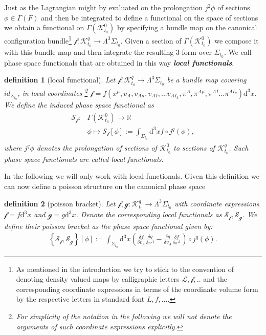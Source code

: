 \documentclass[a4paper,12pt, DIV=14, BCOR=5mm, twoside, headsepline]{scrbook}
\newtheorem{definition}{definition}[section]
\begin{document}
Just as the Lagrangian might by evaluated on the prolongation $j^2\phi$ of sections $\phi \in \Gamma(F)$ and then be integrated to define a functional on the space of sections we obtain a functional on $\Gamma(\mathcal{K}^0_{t_0})$ by specifying a bundle map on the canonical configuration bundle\footnote{As mentioned in the introduction we try to stick to the convention of denoting density valued maps by calligraphic letters $\mathcal{L}, \mathcal{f},..$ and the corresponding coordinate expressions in terms of the coordinate volume form by the respective letters in standard font $L,f,...$.} $\mathcal{f}: \mathcal{K}^q_{t_0} \rightarrow \Lambda^3\Sigma_{t_0}$. Given a section of $\Gamma(\mathcal{K}^0_{t_0})$ we compose it with this bundle map and then integrate the resulting 3-form over $\Sigma_{t_0}$. We call phase space functionals that are obtained in this way \textit{\textbf{local functionals}}. 
\begin{definition}[local functional]
Let $\mathcal{f}: \mathcal{K}^q_{t_0} \rightarrow \Lambda^3\Sigma_{t_0} $ be a bundle map covering $id_{\Sigma_{t_0}}$, in local coordinates \footnote{For simplicity of the notation in the following we will not denote the arguments of such coordinate expressions explicitly.} $\mathcal{f} = f(x^{\mu},v_A,v_{A\mu},v_{AI}, ... v_{AI_k},\pi^A,\pi^{A \mu}, \pi^{AI} ... \pi^{AI_k})\mathrm{d}^3x$. We define the induced phase space functional as
\begin{align}
\begin{aligned}
    \mathcal{S}_{\mathcal{f}} : &\Gamma(\mathcal{K}^0_{t_0}) \longrightarrow \mathbb{R}\\
    &\phi \longmapsto \mathcal{S}_{\mathcal{f}}[\phi] := \int_{\Sigma_{t_0}} \mathrm{d}^3x f \circ j^q(\phi),
\end{aligned}
\end{align}
where $j^q\phi$ denotes the prolongation of sections of $\mathcal{K}^0_{t_0}$ to sections of $\mathcal{K}^q_{t_0}$. Such phase space functionals are called local functionals.
\end{definition}
In the following we will only work with local functionals. 
Given this definition we can now define a poisson structure on the canonical phase space 
\begin{definition}[poisson bracket]
Let $\mathcal{f},\mathcal{g} : \mathcal{K}^q_{t_0} \rightarrow \Lambda^3\Sigma_{t_0} $ with coordinate expressions $\mathcal{f} = f\mathrm{d}^3x$ and $\mathcal{g} = g\mathrm{d}^3x$. Denote the corresponding local functionals as $\mathcal{S}_{\mathcal{f}}, \mathcal{S}_{\mathcal{g}}$. We define their poisson bracket as the phase space functional given by:
\begin{align}
\left \{ \mathcal{S}_{\mathcal{f}}, \mathcal{S}_{\mathcal{g}} \right \}[\phi] := \int _{\Sigma_{t_0}} \mathrm{d}^3x \left ( \frac{\delta f}{\delta v_A} \frac{\delta g}{\delta \pi^A} - \frac{\delta g}{\delta v_A} \frac{\delta f}{\delta \pi^A}     \right ) \circ j^q(\phi)  .
\end{align}
\end{definition}
\end{document}

